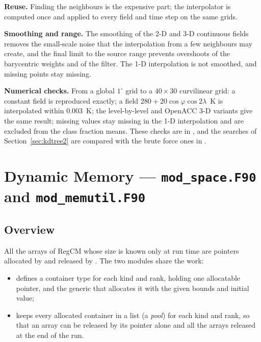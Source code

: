 \textbf{Reuse.} Finding the neighbours is the expensive part; the
interpolator is computed once and applied to every field and time step on
the same grids.

\textbf{Smoothing and range.} The smoothing of the 2-D and 3-D continuous
fields removes the small-scale noise that the interpolation from a few
neighbours may create, and the final limit to the source range prevents
overshoots of the barycentric weights and of the filter. The 1-D
interpolation is not smoothed, and missing points stay missing.

\textbf{Numerical checks.} From a global $1^\circ$ grid to a
$40\times30$ curvilinear grid: a constant field is reproduced exactly; a
field $280 + 20\cos\varphi\cos 2\lambda$~K is interpolated within
0.003~K; the level-by-level and OpenACC 3-D variants give the same result;
missing values stay missing in the 1-D interpolation and are excluded from
the class fraction means.
These checks are in , and the
searches of Section~\ref{sec:kdtree2} are compared with the brute force
ones in .

\section{Dynamic Memory --- \texttt{mod\_space.F90} and \texttt{mod\_memutil.F90}}
\label{sec:memutil}

\subsection{Overview}

All the arrays of RegCM whose size is known only at run time are pointers
allocated by  and released by . The two modules
share the work:
\begin{itemize}
  \item {} defines a container type for each kind and rank,
        holding one allocatable pointer, and the generic  that
        allocates it with the given bounds and initial value;
  \item {} keeps every allocated container in a list (a
        \emph{pool}) for each kind and rank, so that an array can be
        released by its pointer alone and all the arrays released at the end
        of the run.
\end{itemize}

